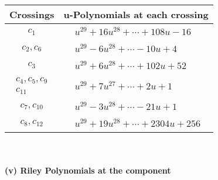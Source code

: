 \documentclass[1p]{elsarticle_modified}
\theoremstyle{definition}
\begin{document}
\begin{tabular}{m{50pt}|m{274pt}}
Crossings & \hspace{64pt}u-Polynomials at each crossing \\
\hline $$\begin{aligned}c_{1}\end{aligned}$$&$\begin{aligned}
&u^{29}+16 u^{28}+\cdots+108 u-16
\end{aligned}$\\
\hline $$\begin{aligned}c_{2},c_{6}\end{aligned}$$&$\begin{aligned}
&u^{29}-6 u^{28}+\cdots-10 u+4
\end{aligned}$\\
\hline $$\begin{aligned}c_{3}\end{aligned}$$&$\begin{aligned}
&u^{29}+6 u^{28}+\cdots+102 u+52
\end{aligned}$\\
\hline $$\begin{aligned}c_{4},c_{5},c_{9}\\c_{11}\end{aligned}$$&$\begin{aligned}
&u^{29}+7 u^{27}+\cdots+2 u+1
\end{aligned}$\\
\hline $$\begin{aligned}c_{7},c_{10}\end{aligned}$$&$\begin{aligned}
&u^{29}-3 u^{28}+\cdots-21 u+1
\end{aligned}$\\
\hline $$\begin{aligned}c_{8},c_{12}\end{aligned}$$&$\begin{aligned}
&u^{29}+19 u^{28}+\cdots+2304 u+256
\end{aligned}$\\
\hline
\end{tabular}\\~\\
\newpage\renewcommand{\arraystretch}{1}
\flushleft \textbf{(v) Riley Polynomials at the component}\newline \\
\end{document}
